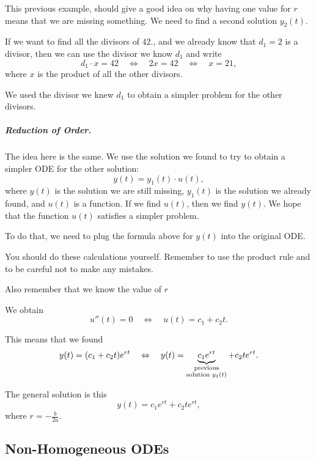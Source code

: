 This previous example, should give a good idea on why having one value for $r$ means that we are missing something. 
We need to find a second solution $y_2(t)$. \\


\begin{graybox}
If we want to find all the divisors of $42$., and we already know that $d_1=2$ is a divisor, then we can use the divisor we know $d_1$ and write 
$$
d_1 \cdot x = 42 
	\quad \Leftrightarrow\quad 2x = 42
	\quad \Leftrightarrow\quad x = 21,
$$
where $x$ is the product of all the other divisors.

We used the divisor we knew $d_1$ to obtain a simpler problem for the other divisors.
\end{graybox}


\subparagraph{\color{cyan}Reduction of Order.} The idea here is the same. We use the solution we found to try to obtain a simpler ODE for the other solution:
$$
y(t) = y_1(t) \cdot u(t),
$$
where $y(t)$ is the solution we are still missing, $y_1(t)$ is the solution we already found, and $u(t)$ is a function. If we find $u(t)$, then we find $y(t)$. We hope that the function $u(t)$ satisfies a simpler problem.

To do that, we need to plug the formula above for $y(t)$ into the original ODE. 

\begin{graybox}
You should do these calculations yourself.
Remember to use the product rule and to be careful not to make any mistakes.	

Also remember that we know the value of $r$
\end{graybox}

We obtain
$$
u''(t) = 0
\quad \Leftrightarrow \quad u(t) = c_1 + c_2 t.
$$

This means that we found 
$$
y(t) = (c_1 + c_2 t) e^{rt}
\quad \Leftrightarrow \quad y(t) = \underbrace{c_1 e^{rt}}_{\substack{\rm previous \\ \text{solution } y_1(t)}} + c_2 t e^{rt}.
$$

The general solution is this
$$
y(t) = c_1 e^{rt} + c_2 t e^{rt},
$$
where $r = -\frac{b}{2a}$.








\subsection{Non-Homogeneous ODEs}

